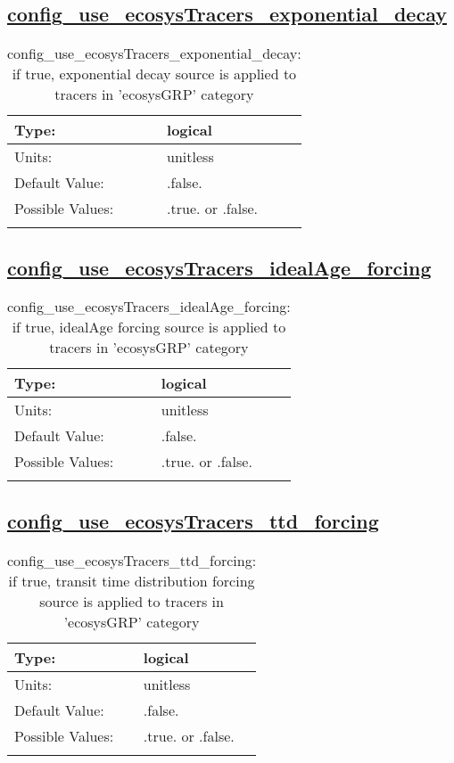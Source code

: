 \subsection[config\_use\_ecosysTracers\_exponential\_decay]{\hyperref[sec:nm_tab_tracer_forcing_ecosysTracers]{config\_use\_ecosysTracers\_exponential\_decay}}
\label{subsec:nm_sec_config_use_ecosysTracers_exponential_decay}
\begin{center}
\begin{longtable}{| p{2.0in} || p{4.0in} |}
    \hline
    Type: & logical \\
    \hline
    Units: & \si{unitless} \\
    \hline
    Default Value: & .false. \\
    \hline
    Possible Values: & .true. or .false. \\
    \hline
    \caption{config\_use\_ecosysTracers\_exponential\_decay: if true, exponential decay source is applied to tracers in 'ecosysGRP' category}
\end{longtable}
\end{center}
\subsection[config\_use\_ecosysTracers\_idealAge\_forcing]{\hyperref[sec:nm_tab_tracer_forcing_ecosysTracers]{config\_use\_ecosysTracers\_idealAge\_forcing}}
\label{subsec:nm_sec_config_use_ecosysTracers_idealAge_forcing}
\begin{center}
\begin{longtable}{| p{2.0in} || p{4.0in} |}
    \hline
    Type: & logical \\
    \hline
    Units: & \si{unitless} \\
    \hline
    Default Value: & .false. \\
    \hline
    Possible Values: & .true. or .false. \\
    \hline
    \caption{config\_use\_ecosysTracers\_idealAge\_forcing: if true, idealAge forcing source is applied to tracers in 'ecosysGRP' category}
\end{longtable}
\end{center}
\subsection[config\_use\_ecosysTracers\_ttd\_forcing]{\hyperref[sec:nm_tab_tracer_forcing_ecosysTracers]{config\_use\_ecosysTracers\_ttd\_forcing}}
\label{subsec:nm_sec_config_use_ecosysTracers_ttd_forcing}
\begin{center}
\begin{longtable}{| p{2.0in} || p{4.0in} |}
    \hline
    Type: & logical \\
    \hline
    Units: & \si{unitless} \\
    \hline
    Default Value: & .false. \\
    \hline
    Possible Values: & .true. or .false. \\
    \hline
    \caption{config\_use\_ecosysTracers\_ttd\_forcing: if true, transit time distribution forcing source is applied to tracers in 'ecosysGRP' category}
\end{longtable}
\end{center}
